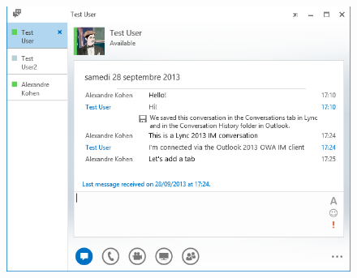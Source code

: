 \begin{figure}
\begin{minipage}[c]{.38\linewidth}
		\includegraphics[width=\textwidth]{Schemas/chat.png}
	\end{minipage}
	\begin{minipage}[c]{.3\linewidth}

\end{minipage}
\end{figure}
